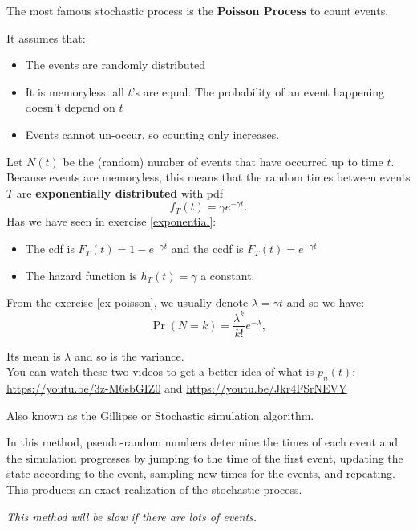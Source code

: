 \begin{SaveDefinition}[key=Poisson, title={Poisson Process}]

The most famous stochastic process is the \textbf{Poisson Process} to count events. 

It assumes that:
\begin{itemize}
	\item The events are randomly distributed
	\item It is memoryless: all $t$'s are equal. The probability of an event happening doesn't depend on $t$
	\item Events cannot un-occur, so counting only increases.
\end{itemize}


Let $N(t)$ be the (random) number of events that have occurred up to time $t$.
Because events are memoryless, this means that the random times between events $T$ are \textbf{exponentially distributed} with pdf
\[
f_T(t) = \gamma e^{-\gamma t}.
\]
Has we have seen in exercise \ref{exponential}:
\begin{itemize}
	\item The cdf is $F_T(t) = 1-e^{-\gamma t}$ and the ccdf is $\tilde{F}_T(t) = e^{-\gamma t}$
	\item The hazard function is $h_T(t) = \gamma$ a constant.
\end{itemize}	

\end{SaveDefinition}


\begin{SaveDefinition}[key=Poisson2, title={Poisson Process}]

From the exercise \ref{ex-poisson}, we usually denote $\lambda = \gamma t$ and so we have:
\[
\Pr(N=k) = \frac{\lambda^k}{k!} e^{-\lambda},
\]

Its mean is $\lambda$ and so is the variance.\\

You can watch these two videos to get a better idea of what is $p_n(t)$: \url{https://youtu.be/3z-M6sbGIZ0} and \url{https://youtu.be/Jkr4FSrNEVY}
\end{SaveDefinition}



\begin{SaveDefinition}[key=discrete-event, title={Discrete Event Method}]

Also known as the Gillipse or Stochastic simulation algorithm.

In this method, pseudo-random numbers determine the times of each event and the simulation progresses by jumping to the time of the first event, updating the state according to the event, sampling new times for the events, and repeating. This produces an exact realization of the stochastic process.

\textit{This method will be slow if there are lots of events.}
\end{SaveDefinition}


